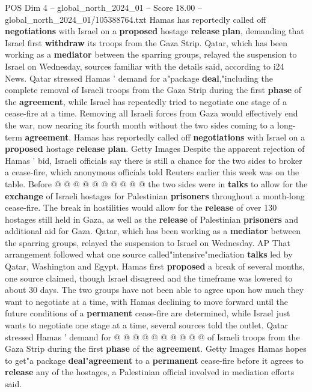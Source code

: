 \begin{textsample}{POS Dim 4 – global\_north\_2024\_01 – Score 18.00 – global\_north\_2024\_01/105388764.txt}  \label{ex:f4_pos_345}
Hamas has reportedly called off \textbf{negotiations} with Israel on a \textbf{proposed} hostage \textbf{release} \textbf{plan}, demanding that Israel first \textbf{withdraw} its troops from the Gaza Strip.
Qatar, which has been working as a \textbf{mediator} between the sparring groups, relayed the suspension to Israel on Wednesday, sources familiar with the details said, according to i24 News.
Qatar stressed Hamas ' demand for a"package \textbf{deal},"including the complete removal of Israeli troops from the Gaza Strip during the first \textbf{phase} of the \textbf{agreement}, while Israel has repeatedly tried to negotiate one stage of a cease-fire at a time.
Removing all Israeli forces from Gaza would effectively end the war, now nearing its fourth month without the two sides coming to a long-term \textbf{agreement}.
Hamas has reportedly called off \textbf{negotiations} with Israel on a \textbf{proposed} hostage \textbf{release} \textbf{plan}.
Getty Images Despite the apparent rejection of Hamas ' bid, Israeli officials say there is still a chance for the two sides to broker a cease-fire, which anonymous officials told Reuters earlier this week was on the table.
Before @ @ @ @ @ @ @ @ @ @ the two sides were in \textbf{talks} to allow for the \textbf{exchange} of Israeli hostages for Palestinian \textbf{prisoners} throughout a month-long cease-fire.
The break in hostilities would allow for the \textbf{release} of over 130 hostages still held in Gaza, as well as the \textbf{release} of Palestinian \textbf{prisoners} and additional aid for Gaza.
Qatar, which has been working as a \textbf{mediator} between the sparring groups, relayed the suspension to Israel on Wednesday.
AP That arrangement followed what one source called"intensive"mediation \textbf{talks} led by Qatar, Washington and Egypt.
Hamas first \textbf{proposed} a break of several months, one source claimed, though Israel disagreed and the timeframe was lowered to about 30 days.
The two groups have not been able to agree upon how much they want to negotiate at a time, with Hamas declining to move forward until the future conditions of a \textbf{permanent} cease-fire are determined, while Israel just wants to negotiate one stage at a time, several sources told the outlet.
Qatar stressed Hamas ' demand for @ @ @ @ @ @ @ @ @ @ of Israeli troops from the Gaza Strip during the first \textbf{phase} of the \textbf{agreement}.
Getty Images Hamas hopes to get"a package \textbf{deal}"\textbf{agreement} to a \textbf{permanent} cease-fire before it agrees to \textbf{release} any of the hostages, a Palestinian official involved in mediation efforts said.

\end{textsample}
